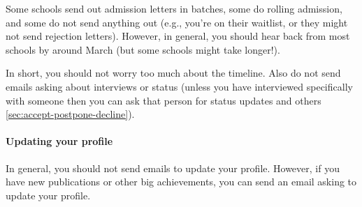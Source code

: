 \documentclass[oneside,11pt,dvipsnames]{book}
\begin{document}
Some schools send out admission letters in batches, some do rolling admission, and some do not send anything out (e.g., you're on their waitlist, or they might not send rejection letters).  However, in general, you should hear back from most schools by around March (but some schools might take longer!).

In short, you should not worry too much about the timeline. Also do not send emails asking about interviews or status (unless you have interviewed specifically with someone then you can ask that person for status updates and others \autoref{sec:accept-postpone-decline}).

\paragraph{Updating your profile} In general, you should not send emails to update your profile.  However, if you have new publications or other big achievements, you can send an email asking to update your profile.








\end{document}
